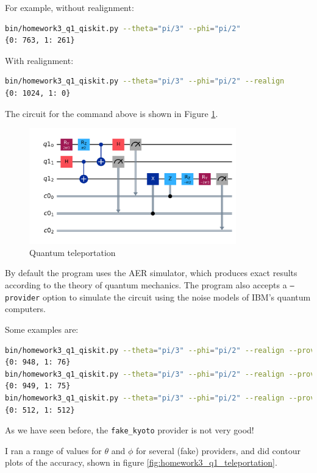 \documentclass[12pt]{extarticle}
\begin{document}
\begin{enumerate}[(a)]
For example, without realignment:
\begin{lstlisting}[language=bash]
bin/homework3_q1_qiskit.py --theta="pi/3" --phi="pi/2"
{0: 763, 1: 261}
\end{lstlisting}
With realignment:
\begin{lstlisting}[language=bash]
bin/homework3_q1_qiskit.py --theta="pi/3" --phi="pi/2" --realign
{0: 1024, 1: 0}
\end{lstlisting}

The circuit for the command above is shown in Figure \ref{fig:homework3_q1_2pi3_pi2_aer}.
\begin{figure}[H]
\centering
\includegraphics[width=0.80\textwidth]{images/homework3_q1_2pi3_pi2_aer.png}
\caption{Quantum teleportation}
\label{fig:homework3_q1_2pi3_pi2_aer}
\end{figure}

By default the program uses the AER simulator, which produces exact results according to the theory of quantum mechanics.
The program also accepts a \texttt{---provider} option to simulate the circuit using the noise models of IBM's quantum computers.

Some examples are:
\begin{lstlisting}[language=bash,basicstyle=\tiny]
bin/homework3_q1_qiskit.py --theta="pi/3" --phi="pi/2" --realign --provider=fake_sherbrooke
{0: 948, 1: 76}
bin/homework3_q1_qiskit.py --theta="pi/3" --phi="pi/2" --realign --provider=fake_osaka
{0: 949, 1: 75}
bin/homework3_q1_qiskit.py --theta="pi/3" --phi="pi/2" --realign --provider=fake_kyoto
{0: 512, 1: 512}
\end{lstlisting}
As we have seen before, the \texttt{fake\_kyoto} provider is not very good!
\end{enumerate}

I ran a range of values for $\theta$ and $\phi$ for several (fake) providers, and did contour plots of the accuracy,
shown in figure \ref{fig:homework3_q1_teleportation}.
\end{document}
